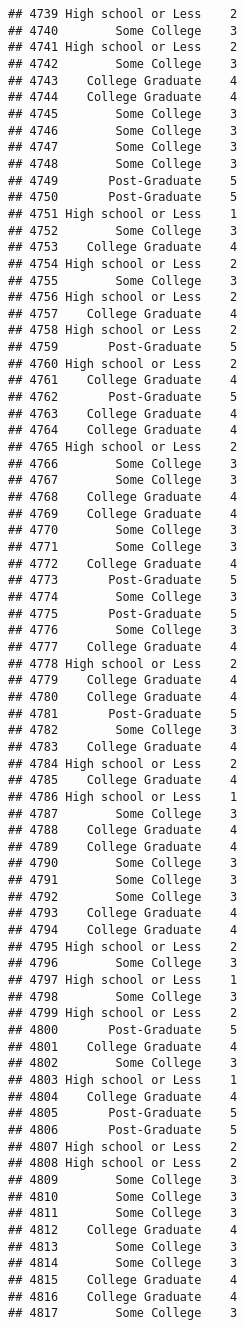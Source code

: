 \documentclass[
]{article}
\begin{document}
\begin{verbatim}
## 4739 High school or Less    2
## 4740        Some College    3
## 4741 High school or Less    2
## 4742        Some College    3
## 4743    College Graduate    4
## 4744    College Graduate    4
## 4745        Some College    3
## 4746        Some College    3
## 4747        Some College    3
## 4748        Some College    3
## 4749       Post-Graduate    5
## 4750       Post-Graduate    5
## 4751 High school or Less    1
## 4752        Some College    3
## 4753    College Graduate    4
## 4754 High school or Less    2
## 4755        Some College    3
## 4756 High school or Less    2
## 4757    College Graduate    4
## 4758 High school or Less    2
## 4759       Post-Graduate    5
## 4760 High school or Less    2
## 4761    College Graduate    4
## 4762       Post-Graduate    5
## 4763    College Graduate    4
## 4764    College Graduate    4
## 4765 High school or Less    2
## 4766        Some College    3
## 4767        Some College    3
## 4768    College Graduate    4
## 4769    College Graduate    4
## 4770        Some College    3
## 4771        Some College    3
## 4772    College Graduate    4
## 4773       Post-Graduate    5
## 4774        Some College    3
## 4775       Post-Graduate    5
## 4776        Some College    3
## 4777    College Graduate    4
## 4778 High school or Less    2
## 4779    College Graduate    4
## 4780    College Graduate    4
## 4781       Post-Graduate    5
## 4782        Some College    3
## 4783    College Graduate    4
## 4784 High school or Less    2
## 4785    College Graduate    4
## 4786 High school or Less    1
## 4787        Some College    3
## 4788    College Graduate    4
## 4789    College Graduate    4
## 4790        Some College    3
## 4791        Some College    3
## 4792        Some College    3
## 4793    College Graduate    4
## 4794    College Graduate    4
## 4795 High school or Less    2
## 4796        Some College    3
## 4797 High school or Less    1
## 4798        Some College    3
## 4799 High school or Less    2
## 4800       Post-Graduate    5
## 4801    College Graduate    4
## 4802        Some College    3
## 4803 High school or Less    1
## 4804    College Graduate    4
## 4805       Post-Graduate    5
## 4806       Post-Graduate    5
## 4807 High school or Less    2
## 4808 High school or Less    2
## 4809        Some College    3
## 4810        Some College    3
## 4811        Some College    3
## 4812    College Graduate    4
## 4813        Some College    3
## 4814        Some College    3
## 4815    College Graduate    4
## 4816    College Graduate    4
## 4817        Some College    3

\end{verbatim}
\end{document}
